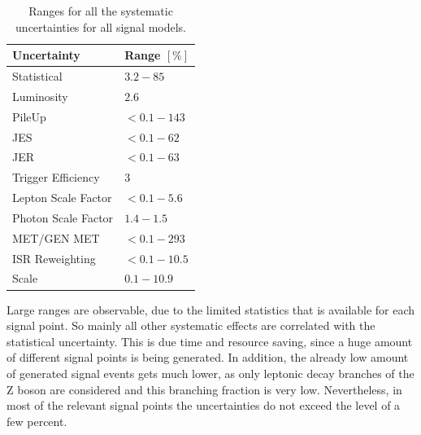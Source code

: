\begin{table}[htb]
 \centering
 \caption{Ranges for all the systematic uncertainties for all signal models.}
 \normalsize
 \label{tab:systuncSignal}
 \begin{tabular}[width=\textwidth]{ll}
  Uncertainty         & Range $[\%]$ \\\hline
  Statistical         & $3.2-85$     \\
  Luminosity          & $2.6$        \\
  PileUp              & $<0.1-143$   \\
  JES                 & $<0.1-62$    \\
  JER                 & $<0.1-63$    \\
  Trigger Efficiency  & $3$          \\
  Lepton Scale Factor & $<0.1-5.6$   \\
  Photon Scale Factor & $1.4-1.5$    \\
  MET/GEN MET         & $<0.1-293$   \\
  ISR Reweighting     & $<0.1-10.5$  \\
  Scale               & $0.1-10.9$   \\
  \hline
 \end{tabular}
\end{table}
Large ranges are observable, due to the limited statistics that is available for each signal point. So mainly all other systematic effects are correlated with the statistical uncertainty. This is due time and resource saving, since a huge amount of different signal points is being generated. In addition, the already low amount of generated signal events gets much lower, as only leptonic decay branches of the Z boson are considered and this branching fraction is very low. Nevertheless, in most of the relevant signal points the uncertainties do not exceed the level of a few percent.
